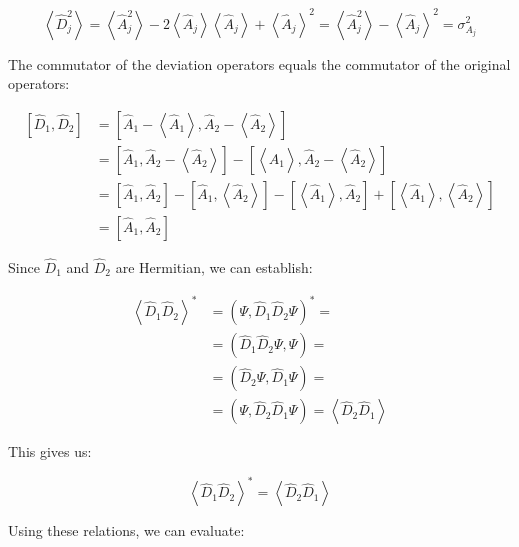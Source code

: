 \documentclass[italian]{HKNdocument}
\begin{document}
\begin{equation}
\left\langle\hat{D}_{j}^{2}\right\rangle=\left\langle\hat{A}_{j}^{2}\right\rangle-2\left\langle\hat{A}_{j}\right\rangle\left\langle\hat{A}_{j}\right\rangle+\left\langle\hat{A}_{j}\right\rangle^{2}=\left\langle\hat{A}_{j}^{2}\right\rangle-\left\langle\hat{A}_{j}\right\rangle^{2}=\sigma_{A_{j}}^{2}
\end{equation}

The commutator of the deviation operators equals the commutator of the original operators:

\begin{align}
{\left[\hat{D}_{1}, \hat{D}_{2}\right] } & =\left[\hat{A}_{1}-\left\langle\hat{A}_{1}\right\rangle, \hat{A}_{2}-\left\langle\hat{A}_{2}\right\rangle\right] \\
& =\left[\hat{A}_{1}, \hat{A}_{2}-\left\langle\hat{A}_{2}\right\rangle\right]-\left[\left\langle\hat{A}_{1}\right\rangle, \hat{A}_{2}-\left\langle\hat{A}_{2}\right\rangle\right] \\
& =\left[\hat{A}_{1}, \hat{A}_{2}\right]-\left[\hat{A}_{1},\left\langle\hat{A}_{2}\right\rangle\right]-\left[\left\langle\hat{A}_{1}\right\rangle, \hat{A}_{2}\right]+\left[\left\langle\hat{A}_{1}\right\rangle,\left\langle\hat{A}_{2}\right\rangle\right]  \\
& =\left[\hat{A}_{1}, \hat{A}_{2}\right]
\end{align}

Since $\hat{D}_1$ and $\hat{D}_2$ are Hermitian, we can establish:

\begin{align}
\left\langle\hat{D}_{1} \hat{D}_{2}\right\rangle^{*} & =\left(\Psi, \hat{D}_{1} \hat{D}_{2} \Psi\right)^{*}= \\
& =\left(\hat{D}_{1} \hat{D}_{2} \Psi, \Psi\right)=  \\
& =\left(\hat{D}_{2} \Psi, \hat{D}_{1} \Psi\right)= \\
& =\left(\Psi, \hat{D}_{2} \hat{D}_{1} \Psi\right)=\left\langle\hat{D}_{2} \hat{D}_{1}\right\rangle
\end{align}

This gives us:

\begin{equation}
\left\langle\hat{D}_{1} \hat{D}_{2}\right\rangle^{*}=\left\langle\hat{D}_{2} \hat{D}_{1}\right\rangle
\end{equation}

Using these relations, we can evaluate:
\end{document}
